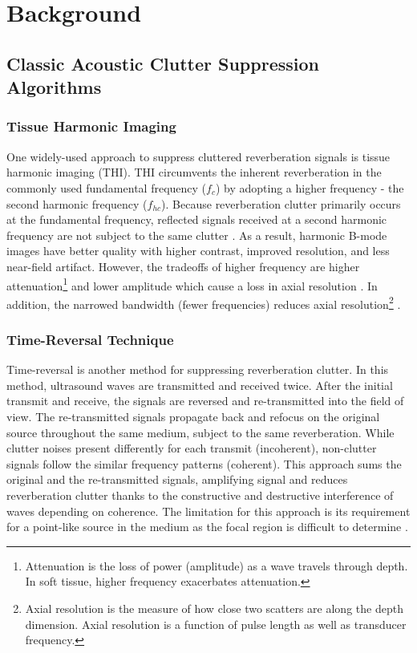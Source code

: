 \chapter{Background}
  \section{Classic Acoustic Clutter Suppression Algorithms} %
    \subsection{Tissue Harmonic Imaging}
      One widely-used approach to suppress cluttered reverberation signals is tissue harmonic imaging (THI). THI circumvents the inherent reverberation in the commonly used fundamental frequency ($f_{c}$) by adopting a higher frequency - the second harmonic frequency ($f_{hc}$). Because reverberation clutter primarily occurs at the fundamental frequency, reflected signals received at a second harmonic frequency are not subject to the same clutter \cite{christopher1997finite, ward1997nonlinear, averkiou1997nonlinear}. As a result, harmonic B-mode images have better quality with higher contrast, improved resolution, and less near-field artifact. However, the tradeoffs of higher frequency are higher attenuation\footnote{Attenuation is the loss of power (amplitude) as a wave travels through depth. In soft tissue, higher frequency exacerbates attenuation.} and lower amplitude which cause a loss in axial resolution \cite{muir1980prediction, starritt1986development, humphrey2000nonlinear, cobbold2006foundations, anvari2015primer}. In addition, the narrowed bandwidth (fewer frequencies) reduces axial resolution\footnote{Axial resolution is the measure of how close two scatters are along the depth dimension. Axial resolution is a function of pulse length as well as transducer frequency.} \cite{whittingham1999tissue}.

    \subsection{Time-Reversal Technique}
      Time-reversal is another method for suppressing reverberation clutter. In this method, ultrasound waves are transmitted and received twice. After the initial transmit and receive, the signals are reversed and re-transmitted into the field of view. The re-transmitted signals propagate back and refocus on the original source throughout the same medium, subject to the same reverberation. While clutter noises present differently for each transmit (incoherent), non-clutter signals follow the similar frequency patterns (coherent). This approach sums the original and the re-transmitted signals, amplifying signal and reduces reverberation clutter thanks to the constructive and destructive interference of waves depending on coherence. The limitation for this approach is its requirement for a point-like source in the medium as the focal region is difficult to determine \cite{dei_thesis, fink1992time}.



